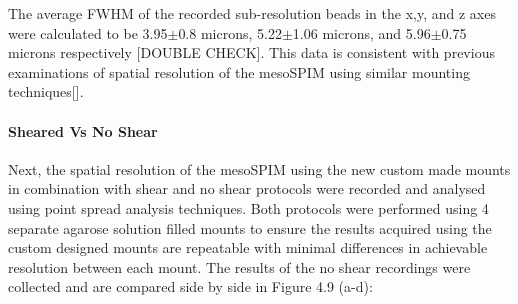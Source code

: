 The average FWHM of the recorded sub-resolution beads in the x,y, and z axes were calculated to be 3.95$\pm$0.8 microns, 5.22$\pm$1.06 microns, and 5.96$\pm$0.75 microns respectively [DOUBLE CHECK]. This data is consistent with previous examinations of spatial resolution of the mesoSPIM using similar mounting techniques[].

\paragraph{Sheared Vs No Shear}
Next, the spatial resolution of the mesoSPIM using the new custom made mounts in combination with shear and no shear protocols were recorded and analysed using point spread analysis techniques. Both protocols were performed using 4 separate agarose solution filled mounts to ensure the results acquired using the custom designed mounts are repeatable with minimal differences in achievable resolution between each mount. The results of the no shear recordings were collected and are compared side by side in Figure 4.9 (a-d):

